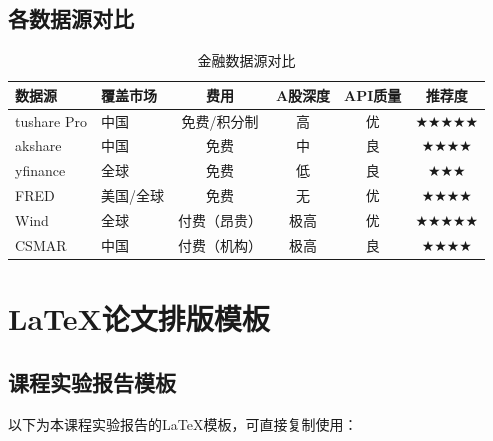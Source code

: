 \section{各数据源对比}

\begin{table}[H]
\centering
\small
\begin{tabular}{llcccc}
\toprule
\textbf{数据源} & \textbf{覆盖市场} & \textbf{费用} & \textbf{A股深度} & \textbf{API质量} & \textbf{推荐度} \\
\midrule
tushare Pro & 中国 & 免费/积分制 & 高 & 优 & ★★★★★ \\
akshare & 中国 & 免费 & 中 & 良 & ★★★★ \\
yfinance & 全球 & 免费 & 低 & 良 & ★★★ \\
FRED & 美国/全球 & 免费 & 无 & 优 & ★★★★ \\
Wind & 全球 & 付费（昂贵） & 极高 & 优 & ★★★★★ \\
CSMAR & 中国 & 付费（机构） & 极高 & 良 & ★★★★ \\
\bottomrule
\end{tabular}
\caption{金融数据源对比}
\end{table}


\chapter{LaTeX论文排版模板}

\section{课程实验报告模板}

以下为本课程实验报告的LaTeX模板，可直接复制使用：

